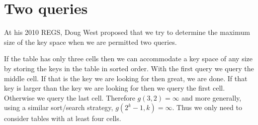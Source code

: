\section{Two queries\label{sec:Yao two queries}}

At his 2010 REGS, Doug West proposed \cite{WestYao} that we try to determine the maximum size of the key space when we are permitted two queries.

If the table has only three cells then we can accommodate a key space of any size by storing the keys in the table in sorted order. With the first query we query the middle cell. If that is the key we are looking for then great, we are done. If that key is larger than the key we are looking for then we query the first cell. Otherwise we query the last cell. Therefore $g\left(3,2\right) = \infty$ and more generally, using a similar sort/search strategy, $g\left(2^k-1,k\right) = \infty$. Thus we only need to consider tables with at least four cells.

